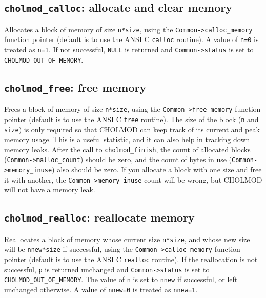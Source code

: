 \documentclass[11pt]{article}
\begin{document}
\subsection{{\tt cholmod\_calloc}: allocate and clear memory}


Allocates a block of memory of size {\tt n*size},
using the {\tt Common->calloc\_memory}
function pointer (default is to use the ANSI C {\tt calloc} routine).
A value of {\tt n=0} is treated as {\tt n=1}.
If not successful, {\tt NULL} is returned and {\tt Common->status} is set to {\tt CHOLMOD\_OUT\_OF\_MEMORY}.

\newpage \subsection{{\tt cholmod\_free}: free memory}


Frees a block of memory of size {\tt n*size},
using the {\tt Common->free\_memory}
function pointer (default is to use the ANSI C {\tt free} routine).
The size of the block ({\tt n} and {\tt size}) is only required so that CHOLMOD
can keep track of its current and peak memory usage.  This is a useful statistic,
and it can also help in tracking down memory leaks.  After the call to
{\tt cholmod\_finish}, the count of allocated blocks ({\tt Common->malloc\_count})
should be zero, and the count of bytes in use ({\tt Common->memory\_inuse}) also
should be zero.  If you allocate a block with one size and free it with another,
the {\tt Common->memory\_inuse} count will be wrong, but CHOLMOD will not
have a memory leak.

\subsection{{\tt cholmod\_realloc}: reallocate memory}


Reallocates a block of memory whose current size {\tt n*size},
and whose new size will be {\tt nnew*size} if successful,
using the {\tt Common->calloc\_memory}
function pointer (default is to use the ANSI C {\tt realloc} routine).
If the reallocation is not successful, {\tt p} is returned unchanged
and {\tt Common->status} is set to {\tt CHOLMOD\_OUT\_OF\_MEMORY}.
The value of {\tt n} is set to {\tt nnew} if successful, or left
unchanged otherwise.
A value of {\tt nnew=0} is treated as {\tt nnew=1}.
\end{document}
